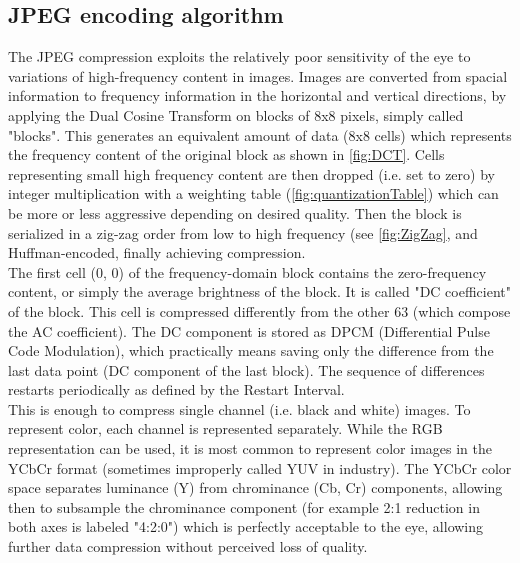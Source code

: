 \subsection{JPEG encoding algorithm}
The JPEG compression exploits the relatively poor sensitivity of the eye to variations of high-frequency content in images. Images are converted from spacial information to frequency information in the horizontal and vertical directions, by applying the Dual Cosine Transform on blocks of 8x8 pixels, simply called "blocks". This generates an equivalent amount of data (8x8 cells)  which represents the frequency content of the original block as shown in \autoref{fig:DCT}. Cells representing small high frequency content are then dropped (i.e. set to zero) by integer multiplication with a weighting table (\autoref{fig:quantizationTable}) which can be more or less aggressive depending on desired quality. Then the block is serialized in a zig-zag order from low to high frequency (see \autoref{fig:ZigZag}, and Huffman-encoded, finally achieving compression.\\
The first cell (0, 0) of the frequency-domain block contains the zero-frequency content, or simply the average brightness of the block. It is called "DC coefficient" of the block. This cell is compressed differently from the other 63 (which compose the AC coefficient). The DC component is stored as DPCM (Differential Pulse Code Modulation), which practically means saving only the difference from the last data point (DC component of the last block). The sequence of differences restarts periodically as defined by the Restart Interval.\\
This is enough to compress single channel (i.e. black and white) images. To represent color, each channel is represented separately. While the RGB representation can be used, it is most common to represent color images in the YCbCr format (sometimes improperly called YUV in industry). The YCbCr color space separates luminance (Y) from chrominance (Cb, Cr) components, allowing then to subsample the chrominance component (for example 2:1 reduction in both axes is labeled "4:2:0") which is perfectly acceptable to the eye, allowing further data compression without perceived loss of quality.

